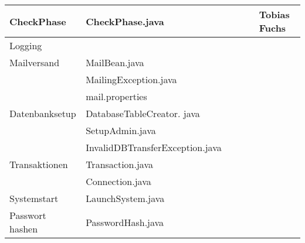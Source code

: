 \documentclass[12pt,a4paper]{scrreprt}
\begin{document}
\begin{landscape}
\begin{tabular}{|p{6cm} |p{6cm}|p{3cm}|p{3cm}|p{2cm}|p{3cm}|}
	    \hline  CheckPhase           &   CheckPhase.java                          &                            &                             &                     & Tobias Fuchs\\
	    \hline  Logging              &                                            &                            &                             &                     &\\ 
	    \hline  Mailversand          &   MailBean.java                            &                            &                             &                     &\\ 	
	                                 &   MailingException.java                    &                            &                             &                     &\\
	                               	 &   mail.properties                          &                            &                             &                     &\\
	    \hline Datenbanksetup        & DatabaseTableCreator. java                 &                            &                             &                     &\\
	                                 & SetupAdmin.java                            &                            &                             &                     &\\
	                                 & InvalidDBTransferException.java            &                            &                             &                     &\\
        \hline Transaktionen         & Transaction.java                           &                            &                             &                     &\\  
                                     & Connection.java                            &                            &                             &                     &\\  
        \hline Systemstart           & LaunchSystem.java                          &                            &                             &                     &\\
        \hline Passwort hashen       & PasswordHash.java                          &                            &                             &                     &\\       	   
		\hline 
	\end{tabular} \ \\
	\ \\


\end{landscape}
\end{document}
